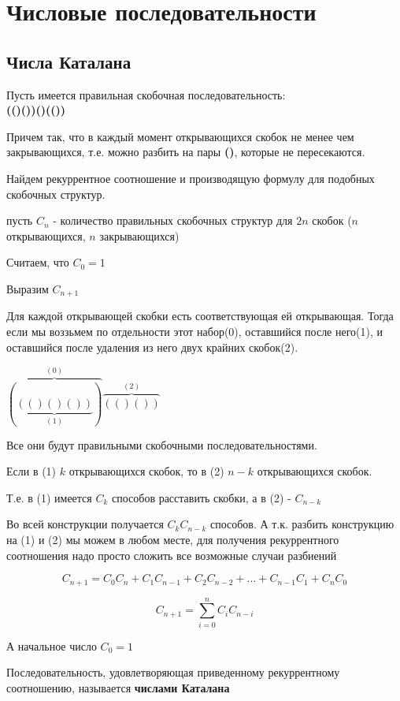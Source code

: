 \section{Числовые последовательности}


\subsection{Числа Каталана}

Пусть имеется правильная скобочная последовательность: \\
\textbf{(()())()(())}

Причем так, что в каждый момент открывающихся скобок не менее чем закрывающихся, 
т.е. можно разбить на пары \textbf{()}, которые не пересекаются.

Найдем рекуррентное соотношение и производящую формулу для подобных скобочных структур.

пусть $ C_{n} $ - количество правильных скобочных структур для $ 2n $ скобок 
($ n $ открывающихся, $ n $ закрывающихся)

Считаем, что $ C_{0} = 1 $

Выразим $ C_{n+1} $

Для каждой открывающей скобки есть соответствующая ей открывающая. 
Тогда если мы воззьмем по отдельности этот набор(0), оставшийся после него(1), и оставшийся после удаления из него двух крайних скобок(2).

$ \overbrace{( \underbrace{(()()())}_{(1)} )}^{(0)} \overbrace{(()())}^{(2)} $

Все они будут правильными скобочными последовательностями.

Если в (1) $ k $ открывающихся скобок, то в (2) $ n-k $ открывающихся скобок.

Т.е. в (1) имеется $ C_{k} $ способов расставить скобки, а в (2) - $ C_{n-k} $

Во всей конструкции получается $ C_{k} C_{n-k} $ способов.
А т.к. разбить конструкцию на (1) и (2) мы можем в любом месте,
для получения рекуррентного соотношения надо просто сложить 
все возможные случаи разбиений

$$
C_{n+1} = C_0 C_n + C_1 C_{n-1} + C_2 C_{n-2} + \ldots + C_{n-1}C_1 + C_n C_0
$$

$$
C_{n+1} =  \sum\limits_{i = 0}^{n} C_i C_{n-i}
$$

А начальное число $ C_{0} = 1 $

Последовательность, удовлетворяющая приведенному рекуррентному соотношению,
называется \textbf{числами Каталана} 

